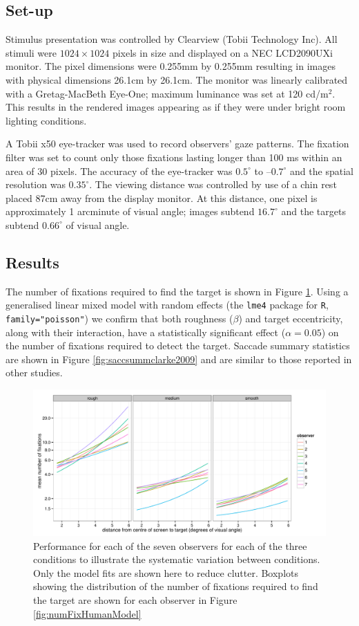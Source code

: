 \documentclass[preprint, authoryear]{elsarticle} %
\begin{document}
\subsection{Set-up}
Stimulus presentation was controlled by Clearview (Tobii Technology Inc). All stimuli were $1024 \times 1024$ pixels in size and displayed on a NEC LCD2090UXi monitor. The pixel dimensions were 0.255mm by 0.255mm resulting in images with physical dimensions 26.1cm by 26.1cm. The monitor was linearly calibrated with a Gretag-MacBeth Eye-One; maximum luminance was set at 120 cd/m$^2$. This results in the rendered images appearing as if they were under bright room lighting conditions.

A Tobii x50 eye-tracker was used to record observers' gaze patterns. The fixation filter was set to count only those fixations lasting longer than 100 ms within an area of 30 pixels. The accuracy of the eye-tracker was $0.5^{\circ}$ to $–0.7^{\circ}$ and the spatial resolution was $0.35^{\circ}$. The viewing distance was controlled by use of a chin rest placed 87cm away from the display monitor. At this distance, one pixel is approximately 1 arcminute of visual angle; images subtend $16.7^{\circ}$ and the targets subtend $0.66^{\circ}$ of visual angle. 

\subsection{Results}
\label{sec:SearchPerf}
The number of fixations required to find the target is shown in Figure \ref{fig:nFixclarke2009}. Using a generalised linear mixed model with random effects (the \texttt{lme4} package for \texttt{R}, \texttt{family="poisson"}) we confirm that both roughness ($\beta$) and target eccentricity, along with their interaction, have a statistically significant effect ($\alpha=0.05$) on the number of fixations required to detect the target. Saccade summary statistics are shown in Figure \ref{fig:saccsummclarke2009} and are similar to those reported in other studies. 

\begin{figure}
	\centering
		\includegraphics[width=12cm]{fig/numFixObs.pdf}
	\caption{Performance for each of the seven observers for each of the three conditions to illustrate the systematic variation between conditions. Only the model fits are shown here to reduce clutter. Boxplots showing the distribution of the number of fixations required to find the target are shown for each observer in Figure \ref{fig:numFixHumanModel}}
	\label{fig:nFixclarke2009}
\end{figure}
\end{document}

